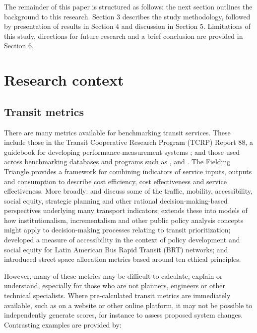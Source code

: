 \documentclass[preprint, 3p,
authoryear]{elsarticle} %
\begin{document}
The remainder of this paper is structured as follows: the next section
outlines the background to this research. Section 3 describes the study
methodology, followed by presentation of results in Section 4 and
discussion in Section 5. Limitations of this study, directions for
future research and a brief conclusion are provided in Section 6.

\section{Research context}\label{research-context}

\subsection{Transit metrics}\label{transit-metrics}

There are many metrics available for benchmarking transit services.
These include those in the Transit Cooperative Research Program (TCRP)
Report 88, a guidebook for developing performance-measurement systems
\citep{Ryus:2003aa}; and those used across benchmarking databases and
programs such as \citet{Florida-Transit-Information-System:2018aa},
\citet{UITP:2015aa} and \citet{Imperial-College-London:2023aa}. The
Fielding Triangle \citep{FieldingGordonJ1987Mpts} provides a framework
for combining indicators of service inputs, outputs and consumption to
describe cost efficiency, cost effectiveness and service effectiveness.
More broadly: \citet{Litman:2003ab} and \citet{Litman:2016aa} discuss
some of the traffic, mobility, accessibility, social equity, strategic
planning and other rational decision-making-based perspectives
underlying many transport indicators; \citet{Reynolds:2017ah} extends
these into models of how institutionalism, incrementalism and other
public policy analysis concepts might apply to decision-making processes
relating to transit prioritization; \citet{GuzmanLuisA.2017Aeit}
developed a measure of accessibility in the context of policy
development and social equity for Latin American Bus Rapid Transit (BRT)
networks; and \citet{Creutzig2020streetspaceallocation} introduced
street space allocation metrics based around ten ethical principles.

However, many of these metrics may be difficult to calculate, explain or
understand, especially for those who are not planners, engineers or
other technical specialists. Where pre-calculated transit metrics are
immediately available, such as on a website or other online platform, it
may not be possible to independently generate scores, for instance to
assess proposed system changes. Contrasting examples are provided by:
\end{document}
